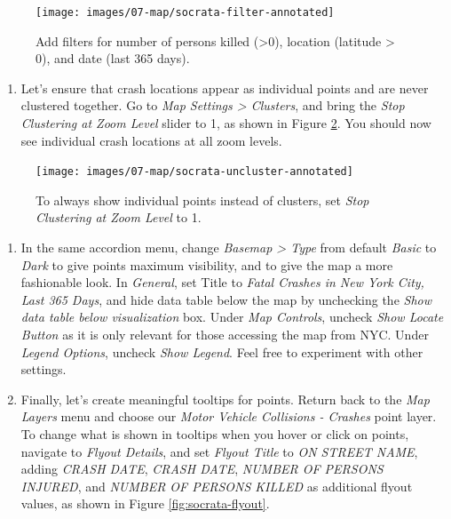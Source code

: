 \documentclass[
  english,
]{book}
\providecommand{\tightlist}{%
  \setlength{\itemsep}{0pt}\setlength{\parskip}{0pt}}
\begin{document}
\begin{figure}
\texttt{[image: images/07-map/socrata-filter-annotated]} \caption{Add filters for number of persons killed (\textgreater0), location (latitude \textgreater{} 0), and date (last 365 days).}\label{fig:socrata-filter}
\end{figure}

\begin{enumerate}
\def\labelenumi{\arabic{enumi}.}
\setcounter{enumi}{6}
\tightlist
\item
  Let's ensure that crash locations appear as individual points and are never clustered together. Go to \emph{Map Settings \textgreater{} Clusters}, and bring the \emph{Stop Clustering at Zoom Level} slider to 1, as shown in Figure \ref{fig:socrata-uncluster}. You should now see individual crash locations at all zoom levels.
\end{enumerate}



\begin{figure}
\texttt{[image: images/07-map/socrata-uncluster-annotated]} \caption{To always show individual points instead of clusters, set \emph{Stop Clustering at Zoom Level} to 1.}\label{fig:socrata-uncluster}
\end{figure}

\begin{enumerate}
\def\labelenumi{\arabic{enumi}.}
\setcounter{enumi}{7}
\item
  In the same accordion menu, change \emph{Basemap \textgreater{} Type} from default \emph{Basic} to \emph{Dark} to give points maximum visibility, and to give the map a more fashionable look. In \emph{General}, set Title to \emph{Fatal Crashes in New York City, Last 365 Days}, and hide data table below the map by unchecking the \emph{Show data table below visualization} box. Under \emph{Map Controls}, uncheck \emph{Show Locate Button} as it is only relevant for those accessing the map from NYC. Under \emph{Legend Options}, uncheck \emph{Show Legend}. Feel free to experiment with other settings.
\item
  Finally, let's create meaningful tooltips for points. Return back to the \emph{Map Layers} menu and choose our \emph{Motor Vehicle Collisions - Crashes} point layer. To change what is shown in tooltips when you hover or click on points, navigate to \emph{Flyout Details}, and set \emph{Flyout Title} to \emph{ON STREET NAME}, adding \emph{CRASH DATE}, \emph{CRASH DATE}, \emph{NUMBER OF PERSONS INJURED}, and \emph{NUMBER OF PERSONS KILLED} as additional flyout values, as shown in Figure \ref{fig:socrata-flyout}.
\end{enumerate}
\end{document}
